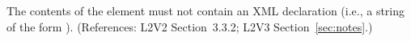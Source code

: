 The contents of the  element must not contain an XML
declaration (i.e., a string of the form ).  (References: L2V2 Section~3.3.2;
L2V3 Section~\ref{sec:notes}.)
